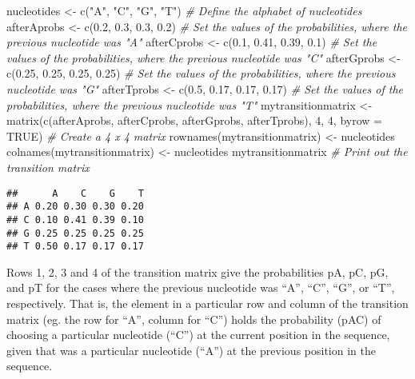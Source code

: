\documentclass[
]{book}
\newenvironment{Shaded}{\begin{snugshade}}{\end{snugshade}}
\newcommand{\AttributeTok}[1]{\textcolor[rgb]{0.77,0.63,0.00}{#1}}
\newcommand{\CommentTok}[1]{\textcolor[rgb]{0.56,0.35,0.01}{\textit{#1}}}
\newcommand{\ConstantTok}[1]{\textcolor[rgb]{0.00,0.00,0.00}{#1}}
\newcommand{\DecValTok}[1]{\textcolor[rgb]{0.00,0.00,0.81}{#1}}
\newcommand{\FloatTok}[1]{\textcolor[rgb]{0.00,0.00,0.81}{#1}}
\newcommand{\FunctionTok}[1]{\textcolor[rgb]{0.00,0.00,0.00}{#1}}
\newcommand{\NormalTok}[1]{#1}
\newcommand{\OtherTok}[1]{\textcolor[rgb]{0.56,0.35,0.01}{#1}}
\newcommand{\StringTok}[1]{\textcolor[rgb]{0.31,0.60,0.02}{#1}}
\begin{document}
\begin{Shaded}
\begin{Highlighting}[]
\NormalTok{nucleotides         }\OtherTok{\textless{}{-}} \FunctionTok{c}\NormalTok{(}\StringTok{"A"}\NormalTok{, }\StringTok{"C"}\NormalTok{, }\StringTok{"G"}\NormalTok{, }\StringTok{"T"}\NormalTok{) }\CommentTok{\# Define the alphabet of nucleotides}
\NormalTok{afterAprobs }\OtherTok{\textless{}{-}} \FunctionTok{c}\NormalTok{(}\FloatTok{0.2}\NormalTok{, }\FloatTok{0.3}\NormalTok{, }\FloatTok{0.3}\NormalTok{, }\FloatTok{0.2}\NormalTok{)         }\CommentTok{\# Set the values of the probabilities, where the previous nucleotide was "A"}
\NormalTok{afterCprobs }\OtherTok{\textless{}{-}} \FunctionTok{c}\NormalTok{(}\FloatTok{0.1}\NormalTok{, }\FloatTok{0.41}\NormalTok{, }\FloatTok{0.39}\NormalTok{, }\FloatTok{0.1}\NormalTok{)       }\CommentTok{\# Set the values of the probabilities, where the previous nucleotide was "C"}
\NormalTok{afterGprobs }\OtherTok{\textless{}{-}} \FunctionTok{c}\NormalTok{(}\FloatTok{0.25}\NormalTok{, }\FloatTok{0.25}\NormalTok{, }\FloatTok{0.25}\NormalTok{, }\FloatTok{0.25}\NormalTok{)     }\CommentTok{\# Set the values of the probabilities, where the previous nucleotide was "G"}
\NormalTok{afterTprobs }\OtherTok{\textless{}{-}} \FunctionTok{c}\NormalTok{(}\FloatTok{0.5}\NormalTok{, }\FloatTok{0.17}\NormalTok{, }\FloatTok{0.17}\NormalTok{, }\FloatTok{0.17}\NormalTok{)      }\CommentTok{\# Set the values of the probabilities, where the previous nucleotide was "T"}
\NormalTok{mytransitionmatrix }\OtherTok{\textless{}{-}} \FunctionTok{matrix}\NormalTok{(}\FunctionTok{c}\NormalTok{(afterAprobs, afterCprobs, afterGprobs, afterTprobs), }\DecValTok{4}\NormalTok{, }\DecValTok{4}\NormalTok{, }\AttributeTok{byrow =} \ConstantTok{TRUE}\NormalTok{) }\CommentTok{\# Create a 4 x 4 matrix}
\FunctionTok{rownames}\NormalTok{(mytransitionmatrix) }\OtherTok{\textless{}{-}}\NormalTok{ nucleotides}
\FunctionTok{colnames}\NormalTok{(mytransitionmatrix) }\OtherTok{\textless{}{-}}\NormalTok{ nucleotides}
\NormalTok{mytransitionmatrix                           }\CommentTok{\# Print out the transition matrix}
\end{Highlighting}
\end{Shaded}

\begin{verbatim}
##      A    C    G    T
## A 0.20 0.30 0.30 0.20
## C 0.10 0.41 0.39 0.10
## G 0.25 0.25 0.25 0.25
## T 0.50 0.17 0.17 0.17
\end{verbatim}

Rows 1, 2, 3 and 4 of the transition matrix give the probabilities pA, pC, pG, and pT for the cases where the previous nucleotide was ``A'', ``C'', ``G'', or ``T'', respectively. That is, the element in a particular row and column of the transition matrix (eg. the row for ``A'', column for ``C'') holds the probability (pAC) of choosing a particular nucleotide (``C'') at the current position in the sequence, given that was a particular nucleotide (``A'') at the previous position in the sequence.
\end{document}
